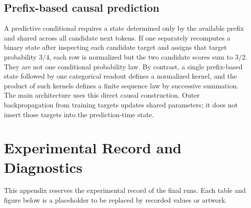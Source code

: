 \documentclass[twoside,11pt]{article}
\begin{document}
\subsection{Prefix-based causal prediction}
\label{sec:causal_prediction_scope}

A predictive conditional requires a state determined only by the available prefix and shared across all candidate next tokens. If one separately recomputes a binary state after inspecting each candidate target and assigns that target probability \(3/4\), each row is normalized but the two candidate scores sum to \(3/2\). They are not one conditional probability law. By contrast, a single prefix-based state followed by one categorical readout defines a normalized kernel, and the product of such kernels defines a finite sequence law by successive summation. The main architecture uses this direct causal construction. Outer backpropagation from training targets updates shared parameters; it does not insert those targets into the prediction-time state.


\section{Experimental Record and Diagnostics}
\label{app:placeholder_experimental_record}

This appendix reserves the experimental record of the final runs. Each table and figure below is a placeholder to be replaced by recorded values or artwork. %
\end{document}
